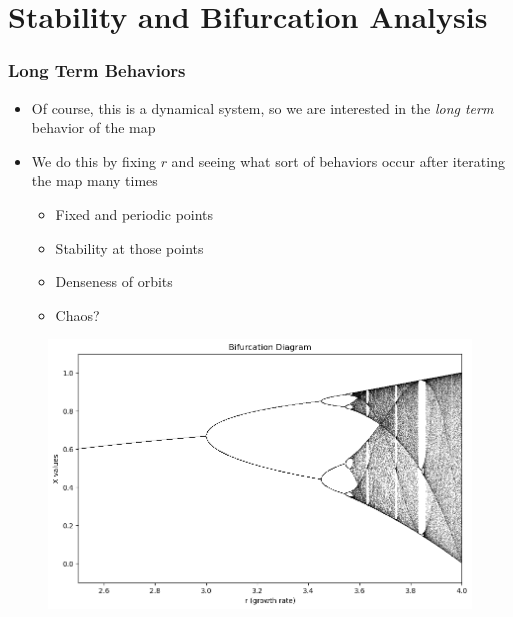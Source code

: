 \documentclass[
	11pt, %
]{beamer}
\begin{document}
\section{Stability and Bifurcation Analysis}
\begin{frame}
	\frametitle{Long Term Behaviors}
 \begin{itemize}
     \item 
     	Of course, this is a dynamical system, so we are interested in the \emph{long term} behavior of the map
      \item 
        We do this by fixing $r$ and seeing what sort of behaviors occur after iterating the map many times
        \begin{itemize}
            \item Fixed and periodic points
            \item Stability at those points
            \item Denseness of orbits
            \item Chaos?
        \end{itemize}
 \end{itemize}
 	\begin{figure}
	\includegraphics[scale=0.3]{./figures/bifurcations}
	\end{figure}
 
\end{frame}
\end{document}
